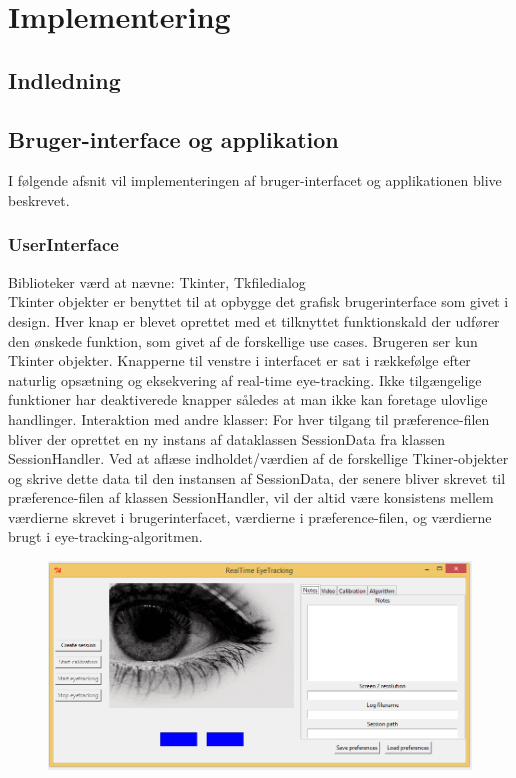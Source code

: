 \documentclass[rapport.tex]{subfiles}
\begin{document}
\section{Implementering}
	\subsection{Indledning}
	\subsection{Bruger-interface og applikation}
	I følgende afsnit vil implementeringen af bruger-interfacet og applikationen blive beskrevet. 
	\subsubsection{UserInterface}
	Biblioteker værd at nævne: Tkinter, Tkfiledialog\\
	
	Tkinter objekter er benyttet til at opbygge det grafisk brugerinterface som givet i design. 
	Hver knap er blevet oprettet med et tilknyttet funktionskald der udfører den ønskede funktion, som givet af de forskellige use cases. 
	Brugeren ser kun Tkinter objekter. 
	Knapperne til venstre i interfacet er sat i rækkefølge efter naturlig opsætning og eksekvering af real-time eye-tracking. Ikke tilgængelige funktioner har deaktiverede knapper således at man ikke kan foretage ulovlige handlinger. 
	Interaktion med andre klasser:
	For hver tilgang til præference-filen bliver der oprettet en ny instans af dataklassen SessionData fra klassen SessionHandler. Ved at aflæse indholdet/værdien af de forskellige Tkiner-objekter og skrive dette data til den instansen af SessionData, der senere bliver skrevet til præference-filen af klassen SessionHandler, vil der altid være konsistens mellem værdierne skrevet i brugerinterfacet, værdierne i præference-filen, og værdierne brugt i eye-tracking-algoritmen. 
	
	\begin{figure}
	\centering
	\includegraphics[width=0.7\linewidth]{GUI1}
	\caption{}
	\label{fig:GUI1}
	\end{figure}
	
\end{document}
